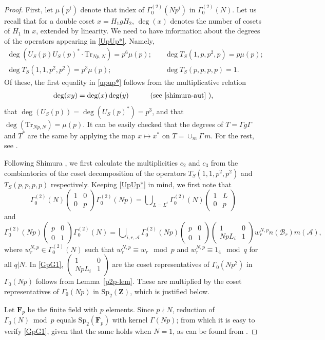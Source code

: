 \documentclass[11pt]{amsart}
\numberwithin{equation}{section}
\theoremstyle{plain}
\theoremstyle{definition}
\newcommand{\lemref}[1]{Lemma~\ref{#1}}
\newcommand{\mf}{\mathbf}
\newcommand{\mc}{\mathcal}
\newcommand{\mrm}{\mathrm}
\newcommand{\q}{\quad}
\newcommand{\smat}[4]{\left( \begin{smallmatrix}#1&#2\\#3&#4\end{smallmatrix}\right)}
\newcommand{\sptwo}{\mrm{Sp}_2( \mf Z)}
\begin{document}
\begin{proof}
First, let $\mu(p^i)$ denote that index of $\Gamma_0^{(2)}(Np^i)$ in $\Gamma^{(2)}_0(N)$. Let us recall that for a double coset $x=H_1gH_2$, $\deg(x)$ denotes the number of cosets of $H_1$ in $x$, extended by linearity. We need to have information  
 about the degrees of the operators appearing in \eqref{UpUp*}. Namely,
\begin{align}
\deg(U_S(p) U_S(p)^* \cdot \mrm{Tr}_{Np,N} )=p^6\mu(p); \label{upup*}\q&\deg T_S(1,p,p^2,p) = p \mu(p); \\
   \deg T_S(1,1,p^2,p^2) = p^3 \mu(p);\q &\deg T_S(p,p,p,p)= 1.\label{degrees}
\end{align}
Of these, the first equality in \eqref{upup*} follows from the multiplicative relation 
\begin{align} \label{deg}
\deg(xy)=\deg(x) \deg(y) \q \q \q (\text{see \cite[Sec.~3.1]{shimura-aut} }),
\end{align}
that $\deg(U_S(p))= \deg(U_S(p)^*)=p^3$, and that $\deg(\mrm{Tr}_{Np,N})=\mu(p)$. It can be easily checked that the degrees of $T=\Gamma g \Gamma$ and $T^*$ are the same by applying the map $x \mapsto x^*$ on $T = \cup_m \Gamma \, m$.
For the rest, see \cite[Chap.~6, Lem.~5.1, Cor.~7.3]{krieg1990hecke}.

Following Shimura \cite{shimura-aut}, we first calculate the multiplicities $c_2$ and $c_3$ from the combinatorics of the coset decomposition of the operators $T_S(1,1,p^2,p^2)$ and $T_S(p,p,p,p)$ respectively. Keeping \eqref{UpUp*} in mind, we first note that
\begin{equation}
    \Gamma^{(2)}_0(N)\smat{1}{0}{0}{p} \Gamma_0^{(2)}(Np) = \bigcup\nolimits_{L=L^t}\Gamma^{(2)}_0(N)\smat{1}{L}{0}{p}
\end{equation}
and 
\begin{equation}\label{GpG1}
    \Gamma_0^{(2)}(Np) \smat{p}{0}{0}{1} \Gamma^{(2)}_0(N) = \bigcup\nolimits_{i,r, \mc A}\Gamma_0^{(2)}(Np)\smat{p}{0}{0}{1} \smat{1}{0}{NpL_i}{1}w_r^{N,p} n(\mc B_r)m( \mc A),
\end{equation}
where $w_r^{N,p}\in \Gamma_0^{(2)}(N)$ such that $w_r^{N,p}\equiv w_r \mod p$ and $w_r^{N,p}\equiv 1_{4} \mod q$ for all $q|N$. In \eqref{GpG1}, $\smat{1}{0}{NpL_i}{1}$ are the coset representatives of $\Gamma_0(Np^2)$ in $\Gamma_0(Np)$ follows from \lemref{p2p-lem}.
These are multiplied by the coset representatives of $\Gamma_0(Np)$ in $\sptwo$, which is justified below.

Let $\mf F_p$ be the finite field with $p$ elements.
Since $p \nmid N$, reduction of $\Gamma_0(N) \bmod p$ equals $\mrm{Sp}_2(\mf F_p)$ with kernel $\Gamma(Np)$; from which it is easy to verify \eqref{GpG1}, given that the same holds when $N=1$, as can be found from \cite{boech-naga}.


\end{proof}
\end{document}

